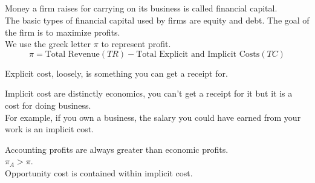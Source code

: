 \subsection{}
Money a firm raises for carrying on its business is called financial capital.\\
The basic types of financial capital used by firms are equity and debt.
The goal of the firm is to maximize profits.\\
We use the greek letter $\pi$ to represent profit.
\begin{equation}
    \pi = \text{Total Revenue}(TR) - \text{Total Explicit and Implicit Costs}(TC)
\end{equation}
\begin{definition}
    Explicit cost, loosely, is something you can get a receipt for.
\end{definition}
\begin{definition}
    Implicit cost are distinctly economics, you can't get a receipt for it but it is a cost for doing business.\\
    For example, if you own a business, the salary you could have earned from your work is an implicit cost.
\end{definition}
Accounting profits are always greater than economic profits.\\
$\pi_A > \pi$.\\
Opportunity cost is contained within implicit cost.